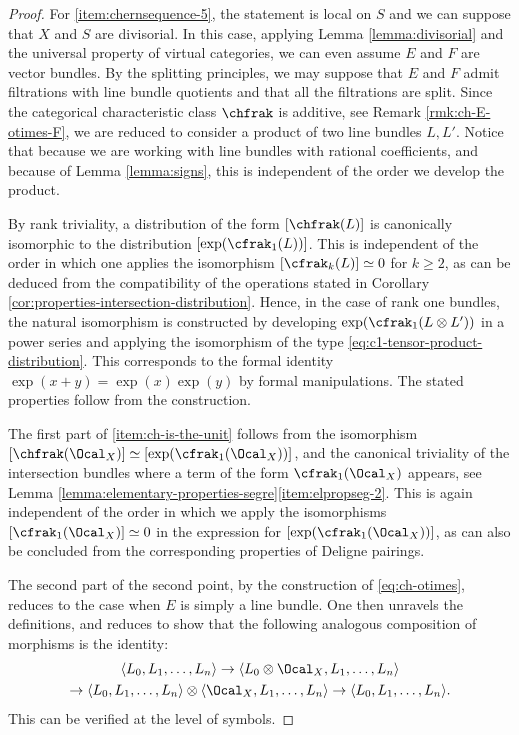 \begin{proof}
For \eqref{item:chernsequence-5}, the statement is local on $S$ and we can suppose that $X$ and $S$ are divisorial. In this case, applying Lemma \ref{lemma:divisorial} and the universal property of virtual categories, we can even assume $E$ and $F$ are vector bundles. By the splitting principles, we may suppose that $E$ and $F$ admit filtrations with line bundle quotients and that all the filtrations are split. Since the categorical characteristic class $\chfrak$ is additive, see Remark \ref{rmk:ch-E-otimes-F}, we are reduced to consider a product of two line bundles $L,L'$. Notice that because we are working with line bundles with rational coefficients, and because of Lemma \ref{lemma:signs}, this is independent of the order we develop the product.

By rank triviality, a distribution of the form $[\chfrak(L)]$ is canonically isomorphic to the distribution $[\exp(\cfrak_1(L))]$. This is independent of the order in which one applies the isomorphism $[\cfrak_k(L)]\simeq 0$ for $k \geq 2$, as can be deduced from the compatibility of the operations stated in Corollary \ref{cor:properties-intersection-distribution}. Hence, in the case of rank one bundles, the natural isomorphism is constructed by developing $\exp(\cfrak_1(L \otimes L'))$ in a power series and applying the isomorphism of the type \eqref{eq:c1-tensor-product-distribution}. This corresponds to the formal identity $\exp(x+y) = \exp(x) \exp(y)$ by formal manipulations. The stated properties follow from the construction.

The first part of \eqref{item:ch-is-the-unit} follows from the isomorphism $[\chfrak(\Ocal_X)]\simeq [\exp(\cfrak_{1}(\Ocal_{X}))]$, and the canonical triviality of the intersection bundles where a term of the form $\cfrak_1(\Ocal_X)$ appears, see Lemma \ref{lemma:elementary-properties-segre}\eqref{item:elpropseg-2}. This is again independent of the order in which we apply the isomorphisms $[\cfrak_1(\Ocal_X)]\simeq 0$ in the expression for $[\exp(\cfrak_{1}(\Ocal_{X}))]$, as can also be concluded from the corresponding properties of Deligne pairings.

The second part of the second point, by the construction of \eqref{eq:ch-otimes}, reduces to the case when $E$ is simply a line bundle. One then unravels the definitions, and reduces to show that the following analogous composition of morphisms is the identity:
\begin{multline*}
\langle L_{0}, L_1, \ldots, L_n \rangle \to \langle L_{0} \otimes \Ocal_X, L_1, \ldots, L_n \rangle\\
\to \langle L_{0}, L_1, \ldots, L_n \rangle \otimes \langle \Ocal_X, L_1, \ldots, L_n \rangle \to \langle L_{0}, L_1, \ldots, L_n\rangle.
\end{multline*}
This can be verified at the level of symbols.
\end{proof}

